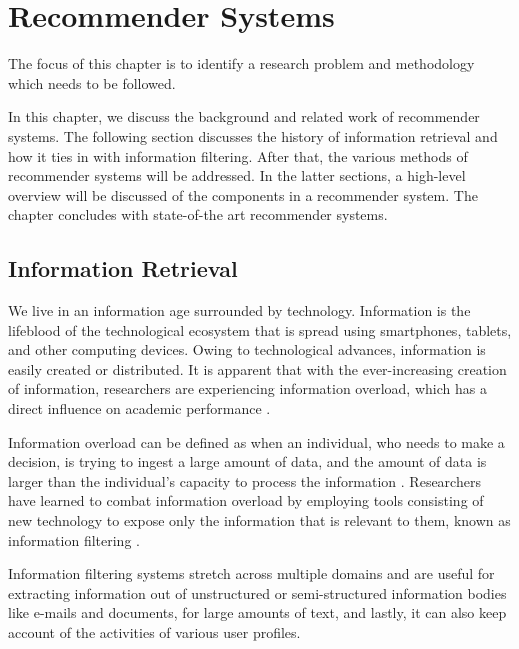 \chapter{Recommender Systems}
\label{chap: Chapter 2}

The focus of this chapter is to identify a research problem and methodology which needs to be followed.

In this chapter, we discuss the background and related work of recommender systems. The following section discusses the history of information retrieval and how it ties in with information filtering. After that, the various methods of recommender systems will be addressed. In the latter sections, a high-level overview will be discussed of the components in a recommender system. The chapter concludes with state-of-the art recommender systems.

\section{Information Retrieval}

We live in an information age surrounded by technology. Information is the lifeblood of the technological ecosystem that is spread using smartphones, tablets, and other computing devices. Owing to technological advances, information is easily created or distributed. It is apparent that with the ever-increasing creation of information, researchers are experiencing information overload, which has a direct influence on academic performance \cite{binti2017influence}.

Information overload can be defined as when an individual, who needs to make a decision, is trying to ingest a large amount of data, and the amount of data is larger than the individual’s capacity to process the information \cite{Heylighen2002ComplexityAI}.
Researchers have learned to combat information overload by employing tools consisting of new technology to expose only the information that is relevant to them, known as information filtering \cite{Hanani2001}. 

Information filtering systems stretch across multiple domains and are useful for extracting information out of unstructured or semi-structured information bodies like e-mails and documents, for large amounts of text, and lastly, it can also keep account of  the activities of various user profiles.

